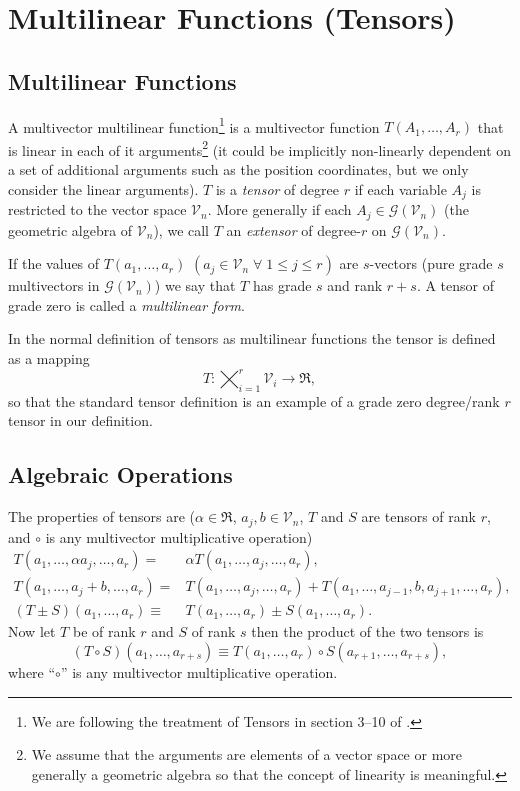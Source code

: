 \documentclass[12pt]{report}
\newcommand{\lp}{\left (}
\newcommand{\rp}{\right )}
\newcommand{\f}[2]{{#1}\lp {#2} \rp}
\newcommand{\be}{\begin{equation}}
\newcommand{\ee}{\end{equation}}
\begin{document}
\section{Multilinear Functions (Tensors)}\label{MLtrans}

\subsection{Multilinear Functions}
A multivector multilinear function\footnote{We are following the treatment of Tensors in section 3--10 of \cite{Hestenes}.} is a
multivector function $\f{T}{A_{1},\dots,A_{r}}$ that is linear in each of it arguments\footnote{We assume that the arguments
are elements of a vector space or more generally a geometric algebra so that the concept of linearity is meaningful.}
(it could be implicitly non-linearly dependent
on a set of additional arguments such as the position coordinates, but we only consider the linear arguments). $T$ is a \emph{tensor}
of degree $r$ if each variable $A_{j}$ is restricted to the vector space $\mathcal{V}_{n}$.  More generally if each
$A_{j}\in\f{\mathcal{G}}{\mathcal{V}_{n}}$ (the geometric algebra of $\mathcal{V}_{n}$), we call $T$ an \emph{extensor} of
degree-$r$ on $\f{\mathcal{G}}{\mathcal{V}_{n}}$.

If the values of $\f{T}{a_{1},\dots,a_{r}}$ $\lp a_{j}\in\mathcal{V}_{n}\;\forall\; 1\le j \le r \rp$ are $s$-vectors
(pure grade $s$ multivectors in
$\f{\mathcal{G}}{\mathcal{V}_{n}}$) we say that $T$ has grade $s$ and rank $r+s$.  A tensor of grade zero is called a
\emph{multilinear form}.

In the normal definition of tensors as multilinear functions the tensor is defined as a mapping
$$T:\bigtimes_{i=1}^{r}\mathcal{V}_{i}\rightarrow\Re,$$ so that the standard tensor definition is an example of a grade zero
degree/rank $r$ tensor in our definition.

\subsection{Algebraic Operations}
The properties of tensors are ($\alpha\in\Re$, $a_{j},b\in\mathcal{V}_{n}$, $T$ and $S$ are tensors of rank $r$,
and $\circ$ is any multivector multiplicative operation)
\begin{align}
    \f{T}{a_{1},\dots,\alpha a_{j},\dots,a_{r}} =& \alpha\f{T}{a_{1},\dots,a_{j},\dots,a_{r}}, \\
    \f{T}{a_{1},\dots,a_{j}+b,\dots,a_{r}} =& \f{T}{a_{1},\dots,a_{j},\dots,a_{r}}+ \f{T}{a_{1},\dots,a_{j-1},b,a_{j+1},\dots,a_{r}}, \\
    \f{\lp T\pm S\rp}{a_{1},\dots,a_{r}} \equiv& \f{T}{a_{1},\dots,a_{r}}\pm\f{S}{a_{1},\dots,a_{r}}.
\end{align}
Now let $T$ be of rank $r$ and $S$ of rank $s$ then the product of the two tensors is
\be
    \f{\lp T\circ S\rp}{a_{1},\dots,a_{r+s}} \equiv \f{T}{a_{1},\dots,a_{r}}\circ\f{S}{a_{r+1},\dots,a_{r+s}},
\ee
where ``$\circ$'' is any multivector multiplicative operation.
\end{document}
